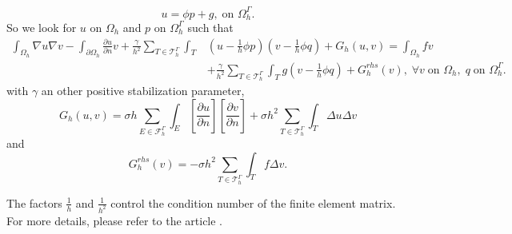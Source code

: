 \begin{enumerate}[label=\textbullet]
\begin{equation*}
		u=\phi p+g, \; \text{on } \Omega_h^\Gamma.
	\end{equation*}
	So we look for $u$ on $\Omega_h$ and $p$ on $\Omega_h^\Gamma$ such that
	\begin{align*}
		\int_{\Omega_h}\nabla u\nabla v-\int_{\partial\Omega_h}\frac{\partial u}{\partial n} v + \frac{\gamma}{h^2} \sum_{T\in\mathcal{T}_h^\Gamma}\int_T &\left(u-\frac{1}{h}\phi p\right)\left(v-\frac{1}{h}\phi q\right) + G_h(u,v) = \int_{\Omega_h}fv \\
		&+ \frac{\gamma}{h^2} \sum_{T\in\mathcal{T}_h^\Gamma}\int_T g\left(v-\frac{1}{h}\phi q\right) + G_h^{rhs}(v), \; \forall v \; \text{on } \Omega_h, \; q \; \text{on } \Omega_h^\Gamma.
	\end{align*}
	with $\gamma$ an other positive stabilization parameter,
	\begin{equation*}
		G_h(u,v)=\sigma h\sum_{E\in\mathcal{F}_h^\Gamma}\int_E\left[\frac{\partial u}{\partial n}\right]\left[\frac{\partial v}{\partial n}\right]+\sigma h^2\sum_{T\in\mathcal{T}_h^\Gamma}\int_T \Delta u\Delta v
	\end{equation*}
	and
	\begin{equation*}
		G_h^{rhs}(v)=-\sigma h^2\sum_{T\in\mathcal{T}_h^\Gamma}\int_T f\Delta v.
	\end{equation*}
	\begin{Rem}
		The factors $\frac{1}{h}$ and $\frac{1}{h^2}$ control the condition number of the finite element matrix. For more details, please refer to the article .
	\end{Rem}
\end{enumerate}